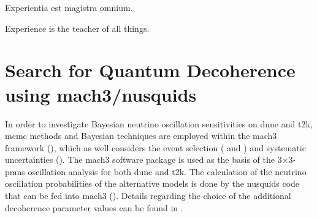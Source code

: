\begin{savequote}[8cm]
Experientia est magistra omnium.

Experience is the teacher of all things.
\end{savequote}

\section{Search for Quantum Decoherence using \texorpdfstring{\acrshort{mach3}}{TEXT}/\texorpdfstring{\acrshort{nusquids}}{TEXT}} \label{sec:qd}
In order to investigate Bayesian neutrino oscillation sensitivities on \acrshort{dune} and \acrshort{t2k}, \acrfull{mcmc} methods and Bayesian techniques are employed within the \acrshort{mach3} framework (), which as well considers the event selection ( and ) and systematic uncertainties (). The \acrshort{mach3} software package is used as the basis of the $3$$\times$$3$-\acrshort{pmns} oscillation analysis for both \acrshort{dune} and \acrshort{t2k}. The calculation of the neutrino oscillation probabilities of the alternative models is done by the \acrshort{nusquids} code that can be fed into \acrshort{mach3} (). Details regarding the choice of the additional decoherence parameter values can be found in .
\newpage
%
